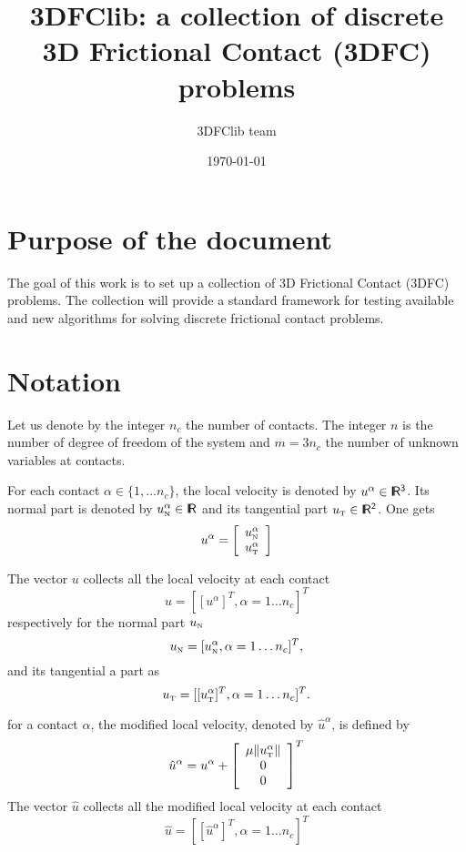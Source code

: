 \documentclass[a4paper,10pt]{article}
\title{3DFClib: a collection  of discrete 3D Frictional Contact (3DFC) problems}
\author{3DFClib team}
\date{\today}
\begin{document}
\maketitle

\tableofcontents


\section*{Purpose of the document}



The goal of this work is to set up a collection of 3D Frictional Contact (3DFC) problems. The collection will provide a standard framework for testing available and new algorithms for solving discrete frictional contact problems. 

\section*{Notation}
Let us denote by the integer $n_c$ the number of contacts. The integer $n$ is the number of degree of freedom of the system and $m = 3 n_c$ the number of unknown variables at contacts.

For each contact $\alpha \in \{1,\ldots n_c\}$, the  local velocity  is denoted by $u^\alpha \in \rm\sf I\!R^3$. Its normal part  is denoted by $u_{\hbox{\tiny{N}}}^{\alpha}\in \rm\sf I\!R$ and its tangential part $u_{\hbox{\tiny{T}}}\in\rm\sf I\!R^2$. One gets
\begin{equation}
  \label{eq:contactvelocity}
  u^\alpha =\left[
  \begin{array}{c}
    u^\alpha_{{\hbox{\tiny{N}}}} \\
    u^\alpha_{{\hbox{\tiny{T}}}}   
  \end{array}\right]
\end{equation}

The vector $u$ collects all the local velocity at each contact
\begin{equation}
  \label{eq:normal}
  u = [[u^\alpha]^T, \alpha = 1\ldots n_c]^T
\end{equation}
respectively for the normal part $u_{\hbox{\tiny{N}}}$
\begin{equation}
  \label{eq:tangent}
  u_{\hbox{\tiny{N}}} = [ u^\alpha_{{\hbox{\tiny{N}}}}, \alpha = 1\ldots n_c]^T,
\end{equation}
and its tangential a part as 
\begin{equation}
  \label{eq:tangent}
  u_{\hbox{\tiny{T}}} = [ [u^\alpha_{{\hbox{\tiny{T}}}}]^T, \alpha = 1\ldots n_c]^T.
\end{equation}

for a contact $\alpha $, the modified local velocity, denoted by $\hat u^\alpha $, is defined by
\begin{equation}
  \label{eq:modified}
  \hat u^\alpha = u^\alpha +\left[
  \begin{array}{c}
    \mu \|u^\alpha_{\hbox{\tiny{T}}}\| \\
    0 \\
    0
  \end{array}\right]^T
\end{equation}
The vector $\hat u$ collects all the modified local velocity at each contact
\begin{equation}
  \label{eq:normal}
  \hat u = [[\hat u^\alpha]^T, \alpha = 1\ldots n_c]^T
\end{equation}
\end{document}
